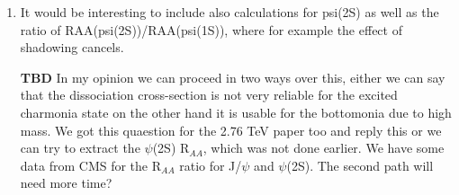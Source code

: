 \documentclass[a4paper,11pt]{article}
\begin{document}
\begin{enumerate}
  \item It would be interesting to include also calculations for psi(2S) as well as the ratio of RAA(psi(2S))/RAA(psi(1S)), where for example the effect
  of shadowing cancels. 


  {\color{red} \textbf{TBD}
    In my opinion we can proceed in two ways over this, either we can say that the dissociation cross-section is not very reliable for the
    excited charmonia state on the other hand it is usable for the bottomonia due to high mass. We got this quaestion for the 2.76 TeV paper
    too and reply this or we can try to extract the $\psi$(2S) R$_{AA}$, which was not done earlier. We have some data from CMS for the
    R$_{AA}$ ratio for J/$\psi$ and $\psi$(2S). The second path will need more time?
    }

\end{enumerate}
\end{document}
